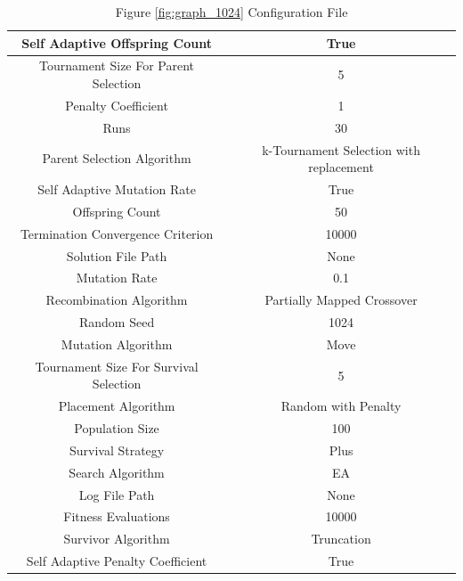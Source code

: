\documentclass{standalone}
\begin{document}
\begin{table}[!htb]
	\centering
	\caption{Figure \ref{fig:graph_1024} Configuration File}
	\label{tab:graph_1024}
	\begin{tabular}{| c | c |}
		\hline
		Self Adaptive Offspring Count		& True		 \\
		\hline
		Tournament Size For Parent Selection		& 5		 \\
		\hline
		Penalty Coefficient		& 1		 \\
		\hline
		Runs		& 30		 \\
		\hline
		Parent Selection Algorithm		& k-Tournament Selection with replacement		 \\
		\hline
		Self Adaptive Mutation Rate		& True		 \\
		\hline
		Offspring Count		& 50		 \\
		\hline
		Termination Convergence Criterion		& 10000		 \\
		\hline
		Solution File Path		& None		 \\
		\hline
		Mutation Rate		& 0.1		 \\
		\hline
		Recombination Algorithm		& Partially Mapped Crossover		 \\
		\hline
		Random Seed		& 1024		 \\
		\hline
		Mutation Algorithm		& Move		 \\
		\hline
		Tournament Size For Survival Selection		& 5		 \\
		\hline
		Placement Algorithm		& Random with Penalty		 \\
		\hline
		Population Size		& 100		 \\
		\hline
		Survival Strategy		& Plus		 \\
		\hline
		Search Algorithm		& EA		 \\
		\hline
		Log File Path		& None		 \\
		\hline
		Fitness Evaluations		& 10000		 \\
		\hline
		Survivor Algorithm		& Truncation		 \\
		\hline
		Self Adaptive Penalty Coefficient		& True		 \\
		\hline
	\end{tabular}
\end{table}
\end{document}
